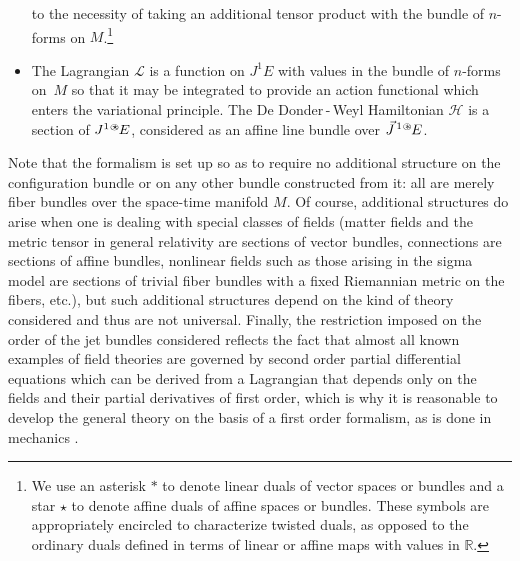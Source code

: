 \documentclass[a4paper,12pt,fleqn]{article}  %
\providecommand{\oast}{\ensuremath{\:\!%
 {\raisebox{0.1ex}{$\scriptscriptstyle \bigcirc$} \hspace{-0.5em} \ast}}}
\providecommand{\ostar}{\ensuremath{\:\!%
 {\raisebox{0.05ex}{$\scriptscriptstyle \bigcirc$} \hspace{-0.5em} \star}}}
\begin{document}
\begin{itemize}
       to the necessity of taking an additional tensor product with the
       bundle of $n$-forms on $M$.\footnote{We use an asterisk $\ast$ to
       denote linear duals of vector spaces or bundles and a star $\star$
       to denote affine duals of affine spaces or bundles. These symbols
       are appropriately encircled to characterize twisted duals, as
       opposed to the ordinary duals defined in terms of linear or
       affine maps with values in $\mathbb{R}$.}
 \item The Lagrangian $\mathcal{L}$ is a function on $J^1 E$ with values
       in the bundle of $n$-forms on~$M$ so that it may be integrated to
       provide an action functional which enters the variational principle.
       The De Donder\,-\,Weyl Hamiltonian $\mathcal{H}$ is a section of
       $J^{1\ostar} E$, considered as an affine line bundle over
       $\vec{J}^{\,1\oast} E$.
\end{itemize}
Note that the formalism is set up so as to require no additional structure
on the con\-figuration bundle or on any other bundle constructed from it:
all are merely fiber bundles over the space-time manifold $M$. Of course,
additional structures do arise when one is dealing with special classes
of fields (matter fields and the metric tensor in general relativity are
sections of vector bundles, connections are sections of affine bundles,
nonlinear fields such as those arising in the sigma model are sections
of trivial fiber bundles with a fixed Riemannian metric on the fibers,
etc.), but such additional structures depend on the kind of theory
considered and thus are not universal. Finally, the restriction
imposed on the order of the jet bundles considered reflects the
fact that almost all known examples of field theories are governed by
second order partial differential equations which can be derived from a
Lagrangian that depends only on the fields and their partial derivatives
of first order, which is why it is reasonable to develop the general
theory on the basis of a first order formalism, as is done in mechanics
\cite{AM,Arn}.
\end{document}
